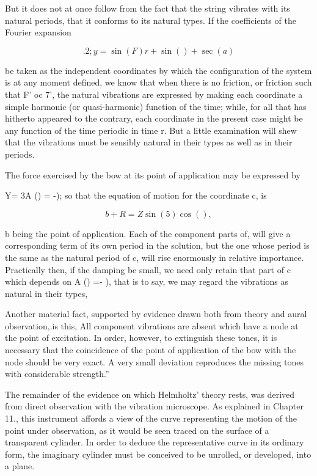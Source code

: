 But it does not at once follow from the fact that the string vibrates with its
natural periods, that it conforms to its natural types. If the coefficients of
the Fourier expansion

\[. 2; y=  \sin(F) r+  \sin()+ \sec(a)\]

be taken as the independent coordinates by which the configuration of the
system is at any moment defined, we know that when there is no friction, or
friction such that F' oc 7', the natural vibrations are expressed by making
each coordinate a simple harmonic (or quasi-harmonic) function of the time;
while, for all that has hitherto appeared to the contrary, each coordinate in
the present case might be any function of the time periodic in time r. But a
little examination will shew that the vibrations must be sensibly natural in
their types as well as in their periods.

The force exercised by the bow at its point of application may be expressed by

Y= 3A () = -); so that the equation of motion for the coordinate c, is

\[b + R = Z \sin(5)  \cos(),\]

b being the point of application. Each of the component parts of, will give a
corresponding term of its own period in the solution, but the one whose period
is the same as the natural period of c, will rise enormously in relative
importance. Practically then, if the damping be small, we need only retain that
part of c which depends on A () =- ), that is to say, we may regard the
vibrations as natural in their types,

Another material fact, supported by evidence drawn both from theory and aural
observation,.is this, All component vibrations are absent which have a node at
the point of excitation. In order, however, to extinguish these tones, it is
necessary that the coincidence of the point of application of the bow with the
node should be very exact. A very small deviation reproduces the missing tones
with considerable strength.''

The remainder of the evidence on which Helmholtz' theory rests, was derived
from direct observation with the vibration microscope. As explained in Chapter
11., this instrument affords a view of the curve representing the motion of the
point under observation, as it would be seen traced on the surface of a
transparent cylinder. In order to deduce the representative curve in its
ordinary form, the imaginary cylinder must be conceived to be unrolled, or
developed, into a plane.

